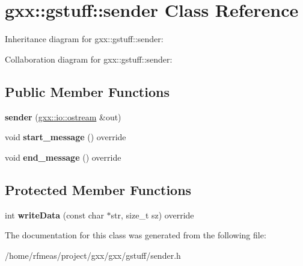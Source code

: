 \hypertarget{classgxx_1_1gstuff_1_1sender}{}\section{gxx\+:\+:gstuff\+:\+:sender Class Reference}
\label{classgxx_1_1gstuff_1_1sender}


Inheritance diagram for gxx\+:\+:gstuff\+:\+:sender\+:


Collaboration diagram for gxx\+:\+:gstuff\+:\+:sender\+:
\subsection*{Public Member Functions}
\begin{DoxyCompactItemize}
\item 
{\bfseries sender} (\hyperlink{classgxx_1_1io_1_1ostream}{gxx\+::io\+::ostream} \&out)\hypertarget{classgxx_1_1gstuff_1_1sender_ae90718c36915fc2670e8a4cf391c60a9}{}\label{classgxx_1_1gstuff_1_1sender_ae90718c36915fc2670e8a4cf391c60a9}

\item 
void {\bfseries start\+\_\+message} () override\hypertarget{classgxx_1_1gstuff_1_1sender_a483dbf66c78894b3c8743e91df1d9e94}{}\label{classgxx_1_1gstuff_1_1sender_a483dbf66c78894b3c8743e91df1d9e94}

\item 
void {\bfseries end\+\_\+message} () override\hypertarget{classgxx_1_1gstuff_1_1sender_a3ed1867f9e12d914f0bbe7da517d6740}{}\label{classgxx_1_1gstuff_1_1sender_a3ed1867f9e12d914f0bbe7da517d6740}

\end{DoxyCompactItemize}
\subsection*{Protected Member Functions}
\begin{DoxyCompactItemize}
\item 
int {\bfseries write\+Data} (const char $\ast$str, size\+\_\+t sz) override\hypertarget{classgxx_1_1gstuff_1_1sender_af70334bda55500ddaa9a0d224a8ccf39}{}\label{classgxx_1_1gstuff_1_1sender_af70334bda55500ddaa9a0d224a8ccf39}

\end{DoxyCompactItemize}


The documentation for this class was generated from the following file\+:\begin{DoxyCompactItemize}
\item 
/home/rfmeas/project/gxx/gxx/gstuff/sender.\+h\end{DoxyCompactItemize}
